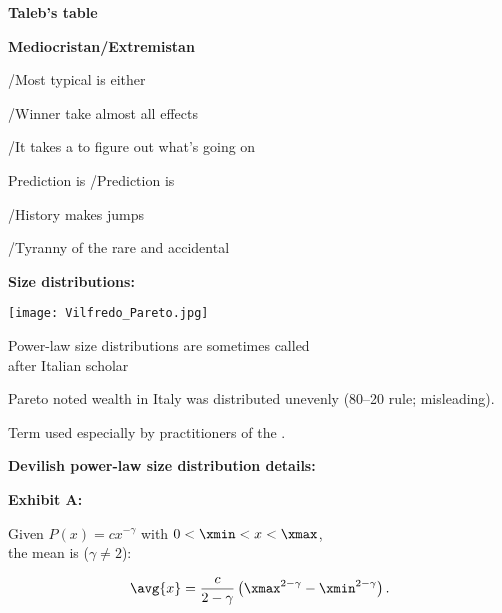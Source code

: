   \textbf{Taleb's table\cite{taleb2007a}}

{\small
  \textbf{Mediocristan/Extremistan}
    
     
       /Most typical is either 
     
      /Winner take almost all effects 
     
      /It
      takes a  to figure out what's going on
     
      Prediction is /Prediction is 
     
      /History makes jumps
     
      /Tyranny of the rare and accidental
    
  
}


  \textbf{Size distributions:}

      
    \texttt{[image: Vilfredo\_Pareto.jpg]}
    
  
    Power-law size distributions 
    are sometimes called\\ 
    after Italian scholar 
  

  
    
    
      Pareto noted wealth in Italy was distributed unevenly
      (80--20 rule; misleading).
    
      Term used especially by practitioners of the 
      .
    
  
  


  \textbf{Devilish power-law size distribution details:}

  \textbf{Exhibit A:} 
    
     
      Given $P(x) = c x^{-\gamma}$ with $0 < \xmin < x < \xmax$,\\
      the mean is ($\gamma \ne 2$):
    
    $$ \avg{x} = \frac{c}{2-\gamma} \left( \xmax^{2-\gamma} - \xmin^{2-\gamma} \right). $$
  

  
    
